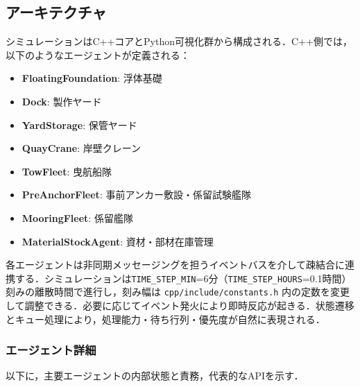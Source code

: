 \documentclass[10pt,letterpaper]{jsarticle}
\begin{document}
\subsection{アーキテクチャ}
シミュレーションはC++コアとPython可視化群から構成される．C++側では，以下のようなエージェントが定義される：

\begin{itemize}
  \item \textbf{FloatingFoundation}: 浮体基礎
  \item \textbf{Dock}: 製作ヤード
  \item \textbf{YardStorage}: 保管ヤード
  \item \textbf{QuayCrane}: 岸壁クレーン
  \item \textbf{TowFleet}: 曳航船隊
  \item \textbf{PreAnchorFleet}: 事前アンカー敷設・係留試験艦隊
  \item \textbf{MooringFleet}: 係留艦隊
  \item \textbf{MaterialStockAgent}: 資材・部材在庫管理
\end{itemize}

各エージェントは非同期メッセージングを担うイベントバスを介して疎結合に連携する．シミュレーションは\texttt{TIME\_STEP\_MIN}=6分（\texttt{TIME\_STEP\_HOURS}=0.1時間）刻みの離散時間で進行し，刻み幅は \texttt{cpp/include/constants.h} 内の定数を変更して調整できる．必要に応じてイベント発火により即時反応が起きる．状態遷移とキュー処理により，処理能力・待ち行列・優先度が自然に表現される．

\subsubsection{エージェント詳細}
以下に，主要エージェントの内部状態と責務，代表的なAPIを示す．
\end{document}
